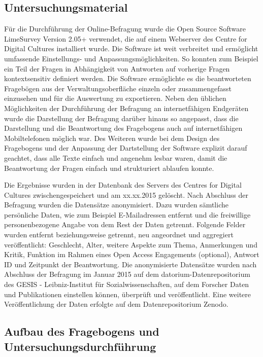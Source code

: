 \subsection{Untersuchungsmaterial}

Für die Durchführung der Online-Befragung wurde die Open Source Software LimeSurvey Version 2.05+ verwendet, die auf einem Webserver des Centre for Digital Cultures installiert wurde. Die Software ist weit verbreitet und ermöglicht umfassende Einstellungs- und Anpassungsmöglichkeiten. So konnten zum Beispiel ein Teil der Fragen in Abhängigkeit von Antworten auf vorherige Fragen kontextsensitiv definiert werden. Die Software ermöglichte es die beantworteten Fragebögen aus der Verwaltungsoberfläche einzeln oder zusammengefasst einzusehen und für die Auswertung zu exportieren. Neben den üblichen Möglichkeiten der Durchführung der Befragung an internetfähigen Endgeräten wurde die Darstellung der Befragung darüber hinaus so angepasst, dass die Darstellung und die Beantwortung des Fragebogens auch auf internetfähigen Mobiltelefonen möglich war. Des Weiteren wurde bei dem Design des Fragebogens und der Anpassung der Dartstellung der Software explizit darauf geachtet, dass alle Texte einfach und angenehm lesbar waren, damit die Beantwortung der Fragen einfach und strukturiert ablaufen konnte.

Die Ergebnisse wurden in der Datenbank des Servers des Centres for Digital Cultures zwischengespeichert und am xx.xx.2015 gelöscht. Nach Abschluss der Befragung wurden die Datensätze anonymisiert. Dazu wurden sämtliche persönliche Daten, wie zum Beispiel E-Mailadressen entfernt und die freiwillige personenbezogene Angabe von dem Rest der Daten getrennt. Folgende Felder wurden entfernt beziehungsweise getrennt, neu angeordnet und aggregiert veröffentlicht: Geschlecht, Alter, weitere Aspekte zum Thema, Anmerkungen und Kritik, Funktion im Rahmen eines Open Access Engagements (optional), Antwort ID und Zeitpunkt der Beantwortung. Die anonymisierte Datensätze wurden nach Abschluss der Befragung im Januar 2015 auf dem datorium-Datenrepositorium des GESIS - Leibniz-Institut für Sozialwissenschaften, auf dem Forscher Daten und Publikationen einstellen können, überprüft und veröffentlicht. Eine weitere Veröffentlichung der Daten erfolgte auf dem Datenrepositorium Zenodo.

\subsection{Aufbau des Fragebogens und Untersuchungsdurchführung}

